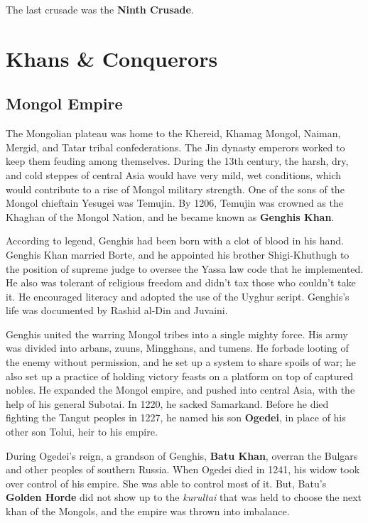 The last crusade was the \textbf{Ninth Crusade}.

\section{Khans \& Conquerors}

\subsection*{Mongol Empire}

The Mongolian plateau was home to the Khereid, Khamag Mongol, Naiman, Mergid, and Tatar tribal confederations.
The Jin dynasty emperors worked to keep them feuding among themselves.
During the 13th century, the harsh, dry, and cold steppes of central Asia would have very mild, wet conditions,
which would contribute to a rise of Mongol military strength.
One of the sons of the Mongol chieftain Yesugei was Temujin.
By 1206, Temujin was crowned as the Khaghan of the Mongol Nation,
and he became known as \textbf{Genghis Khan}.

According to legend, Genghis had been born with a clot of blood in his hand.
Genghis Khan married Borte,
and he appointed his brother Shigi-Khuthugh to the position of supreme judge
to oversee the Yassa law code that he implemented.
He also was tolerant of religious freedom and didn't tax those who couldn't take it.
He encouraged literacy and adopted the use of the Uyghur script.
Genghis's life was documented by Rashid al-Din and Juvaini.

Genghis united the warring Mongol tribes into a single mighty force.
His army was divided into arbans, zuuns, Mingghans, and tumens.
He forbade looting of the enemy without permission, and he set up a system to share spoils of war;
he also set up a practice of holding victory feasts on a platform on top of captured nobles.
He expanded the Mongol empire, and pushed into central Asia, with the help of his general Subotai.
In 1220, he sacked Samarkand.
Before he died fighting the Tangut peoples in 1227,
he named his son \textbf{Ogedei}, in place of his other son Tolui, heir to his empire.

During Ogedei's reign, a grandson of Genghis, \textbf{Batu Khan},
overran the Bulgars and other peoples of southern Russia.
When Ogedei died in 1241, his widow took over control of his empire.
She was able to control most of it.
But, Batu's \textbf{Golden Horde} did not show up to the
\textit{kurultai} that was held to choose the next khan of the Mongols,
and the empire was thrown into imbalance.

